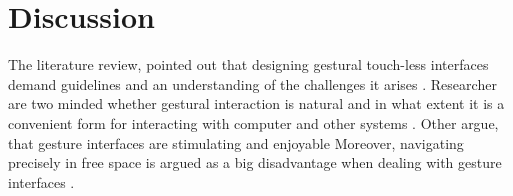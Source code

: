 \chapter{Discussion}
\label{chap:discussion}







The literature review, pointed out that designing gestural touch-less interfaces demand guidelines and an understanding of the challenges it arises \cite{NormanNielsen2010, Malizia2012, Montero2010}. Researcher are two minded whether gestural interaction is natural and in what extent it is a convenient form for interacting with computer and other systems \cite{Montero2010, Malizia2012, Norman2010, ParkWonkyu2013, Riener2012}. Other argue, that gesture interfaces are stimulating and enjoyable \cite{Loehmann2013, RenGang2013} Moreover, navigating precisely in free space is argued as a big disadvantage when dealing with gesture interfaces \cite{Ni2011, Siek2005}.

